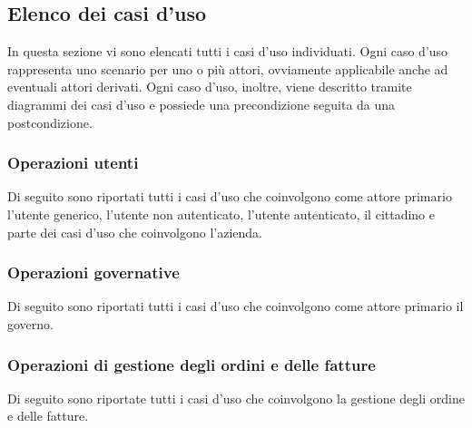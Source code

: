 \subsection{Elenco dei casi d'uso}
In questa sezione vi sono elencati tutti i casi d'uso individuati. Ogni caso 
d'uso rappresenta uno scenario per uno o più attori, ovviamente applicabile 
anche ad eventuali attori derivati. Ogni caso d'uso, inoltre, viene descritto 
tramite diagrammi dei casi d'uso e possiede una precondizione seguita da una 
postcondizione.
\subsubsection*{Operazioni utenti}
Di seguito sono riportati tutti i casi d'uso che coinvolgono come attore 
primario l'utente generico, l'utente non autenticato, l'utente autenticato, il 
cittadino e parte dei casi d'uso che coinvolgono l'azienda.







\pagebreak
\subsubsection*{Operazioni governative}
Di seguito sono riportati tutti i casi d'uso che coinvolgono come attore 
primario il governo.




\pagebreak
\subsubsection*{Operazioni di gestione degli ordini e delle fatture}
Di seguito sono riportate tutti i casi d'uso che coinvolgono la gestione degli 
ordine e delle fatture.



